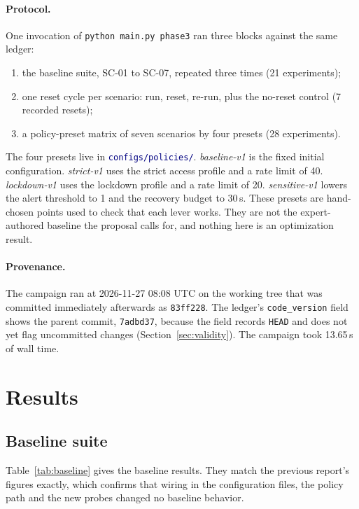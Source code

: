 \documentclass[11pt]{article}
\newcommand{\code}[1]{\texttt{\small #1}}
\newcommand{\file}[1]{\textcolor{navy}{\texttt{\small #1}}}
\begin{document}
\paragraph{Protocol.} One invocation of \code{python main.py phase3} ran three
blocks against the same ledger:
\begin{enumerate}[leftmargin=1.6em,itemsep=1pt]
\item the baseline suite, SC-01 to SC-07, repeated three times (21 experiments);
\item one reset cycle per scenario: run, reset, re-run, plus the no-reset control
(7 recorded resets);
\item a policy-preset matrix of seven scenarios by four presets (28 experiments).
\end{enumerate}
The four presets live in \file{configs/policies/}. \emph{baseline-v1} is the fixed
initial configuration. \emph{strict-v1} uses the strict access profile and a rate
limit of 40. \emph{lockdown-v1} uses the lockdown profile and a rate limit of 20.
\emph{sensitive-v1} lowers the alert threshold to 1 and the recovery budget to
30\,s. These presets are hand-chosen points used to check that each lever works.
They are not the expert-authored baseline the proposal calls for, and nothing here
is an optimization result.

\paragraph{Provenance.} The campaign ran at 2026-11-27 08:08 UTC on the working tree
that was committed immediately afterwards as \code{83ff228}. The ledger's
\code{code\_version} field shows the parent commit, \code{7adbd37}, because the
field records \code{HEAD} and does not yet flag uncommitted changes
(Section~\ref{sec:validity}). The campaign took 13.65\,s of wall time.

\section{Results}
\label{sec:results}

\subsection{Baseline suite}
Table~\ref{tab:baseline} gives the baseline results. They match the previous
report's figures exactly, which confirms that wiring in the configuration files,
the policy path and the new probes changed no baseline behavior.
\end{document}
